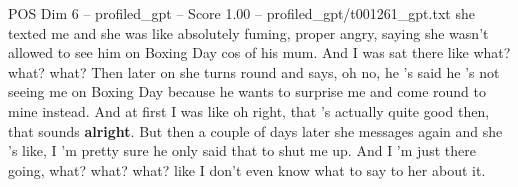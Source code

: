 \begin{textsample}{POS Dim 6 – profiled\_gpt – Score 1.00 – profiled\_gpt/t001261\_gpt.txt}  \label{ex:f6_pos_038}
she texted me and she was like absolutely fuming, proper angry, saying she wasn't allowed to see him on Boxing Day cos of his mum.
And I was sat there like what? what? what?
Then later on she turns round and says, oh no, he ’s said he ’s not seeing me on Boxing Day because he wants to surprise me and come round to mine instead.
And at first I was like oh right, that ’s actually quite good then, that sounds \textbf{alright}.
But then a couple of days later she messages again and she ’s like, I ’m pretty sure he only said that to shut me up.
And I ’m just there going, what? what? what? like I don't even know what to say to her about it.

\end{textsample}
